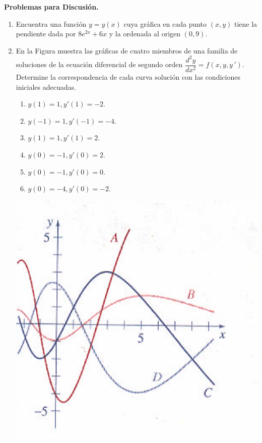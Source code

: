 \documentclass[letterpaper,10pt]{memoir}
\begin{document}
{\large \textbf{Problemas para Discusión.}}
\begin{enumerate}
	\item Encuentra una función \(y=y(x)\) cuya gráfica en cada punto \((x,y)\) tiene la pendiente dada por \(8e^{2x} +6x\) y la ordenada al origen \((0,9)\).
	\item En la Figura muestra las gráficas de cuatro miembros de una familia de soluciones de la ecuación diferencial de segundo orden \(\dfrac{d^2y}{dx^2} =f(x,y,y \,')\). Determine la correspondencia de cada curva solución con las condiciones iniciales adecuadas.\\
		\begin{minipage}{0.4\linewidth}
			\begin{enumerate}
				\item \(y(1) = 1, y'(1) = -2\).
				\item \(y(-1) = 1, y'(-1) = -4\).
				\item \(y(1) = 1, y'(1) = 2\).
				\item \(y(0) = -1, y' (0) = 2\).
				\item \(y(0) = -1, y'(0) = 0\).
				\item \(y(0) = -4, y' (0) = -2\).
			\end{enumerate}
		\end{minipage}\hspace{5mm}
		\begin{minipage}{0.6\linewidth}
				\includegraphics[width= 0.9 \linewidth]{IMAGENES/images/image5.png}

\end{minipage}
\end{enumerate}
\end{document}
